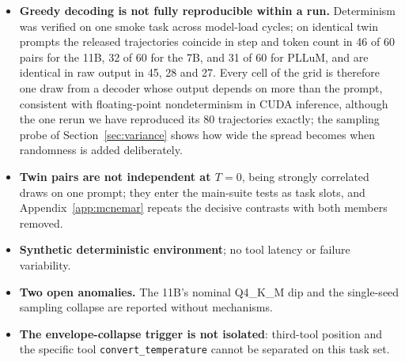 \documentclass[11pt]{article}
\begin{document}
\begin{itemize}
  \item \textbf{Greedy decoding is not fully reproducible within a run.} Determinism was verified on one smoke task across model-load cycles; on identical twin prompts the released trajectories coincide in step and token count in 46 of 60 pairs for the 11B, 32 of 60 for the 7B, and 31 of 60 for PLLuM, and are identical in raw output in 45, 28 and 27. Every cell of the grid is therefore one draw from a decoder whose output depends on more than the prompt, consistent with floating-point nondeterminism in CUDA inference, although the one rerun we have reproduced its 80 trajectories exactly; the sampling probe of Section~\ref{sec:variance} shows how wide the spread becomes when randomness is added deliberately.
  \item \textbf{Twin pairs are not independent at $T=0$}, being strongly correlated draws on one prompt; they enter the main-suite tests as task slots, and Appendix~\ref{app:mcnemar} repeats the decisive contrasts with both members removed.
  \item \textbf{Synthetic deterministic environment}; no tool latency or failure variability.
  \item \textbf{Two open anomalies.} The 11B's nominal Q4\_K\_M dip and the single-seed sampling collapse are reported without mechanisms.
  \item \textbf{The envelope-collapse trigger is not isolated}: third-tool position and the specific tool \texttt{convert\_temperature} cannot be separated on this task set.
\end{itemize}
\end{document}
